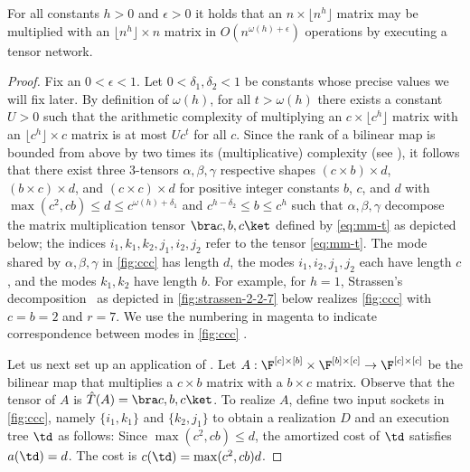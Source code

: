 \begin{lemma}
\label{lem:mm}
For all constants $h>0$ and $\epsilon>0$ it holds that
an $n\times\lfloor n^h\rfloor$
matrix may be multiplied with an $\lfloor n^h\rfloor\times n$ matrix
in $O(n^{\omega(h)+\epsilon})$ operations by executing a tensor network.
\end{lemma}
\begin{proof}
Fix an $0<\epsilon<1$. Let $0<\delta_1,\delta_2<1$ be constants whose
precise values we will fix later.
By definition of $\omega(h)$, for all $t>\omega(h)$ there exists a constant
$U>0$ such that the arithmetic complexity of multiplying
an $c\times\lfloor c^h\rfloor$ matrix with an $\lfloor c^h\rfloor\times c$
matrix is at most $Uc^t$ for all $c$. Since the rank of a bilinear map
is bounded from above by two times its (multiplicative)
complexity (see \cite[\S14.1]{Buergisser1997}), %
it follows that there exist three $3$-tensors $\alpha,\beta,\gamma$
respective shapes $(c\times b)\times d$, $(b\times c)\times d$, and
$(c\times c)\times d$ for positive integer constants $b$, $c$, and $d$ with
$\max(c^2,cb)\leq d\leq c^{\omega(h)+\delta_1}$ and
$c^{h-\delta_2}\leq b\leq c^h$
such that $\alpha,\beta,\gamma$ decompose the matrix multiplication
tensor $\bra c,b,c\ket$ defined by \eqref{eq:mm-t} as depicted below; the
indices $i_1,k_1,k_2,j_1,i_2,j_2$ refer to the tensor \eqref{eq:mm-t}.
The mode shared by $\alpha,\beta,\gamma$ in \eqref{fig:ccc} has length $d$,
the modes $i_1,i_2,j_1,j_2$ each have length $c$, and the modes
$k_1,k_2$ have length $b$.
For example, for $h=1$, Strassen's decomposition~\cite{Strassen1969} as
depicted in \eqref{fig:strassen-2-2-7} below realizes \eqref{fig:ccc}
with $c=b=2$ and $r=7$.
We use the numbering in magenta to indicate correspondence between
modes in \eqref{fig:ccc} .

Let us next set up an application of .
Let
$A:\F^{[c]\times [b]}\times \F^{[b]\times [c]}\rightarrow \F^{[c]\times [c]}$
be the bilinear map that multiplies a $c\times b$ matrix with
a $b\times c$ matrix. Observe that the tensor of $A$ is
$\hat{T}(A)=\bra c,b,c\ket$.
To realize $A$, define two input sockets in \eqref{fig:ccc},
namely $\{i_1,k_1\}$ and $\{k_2,j_1\}$
to obtain a realization $D$ and an execution tree $\td$ as follows:
Since $\max(c^2,cb)\leq d$, the amortized cost of $\td$ satisfies
$a(\td)=d$. The cost is $c(\td)=\max(c^2,cb)d$.


\end{proof}
